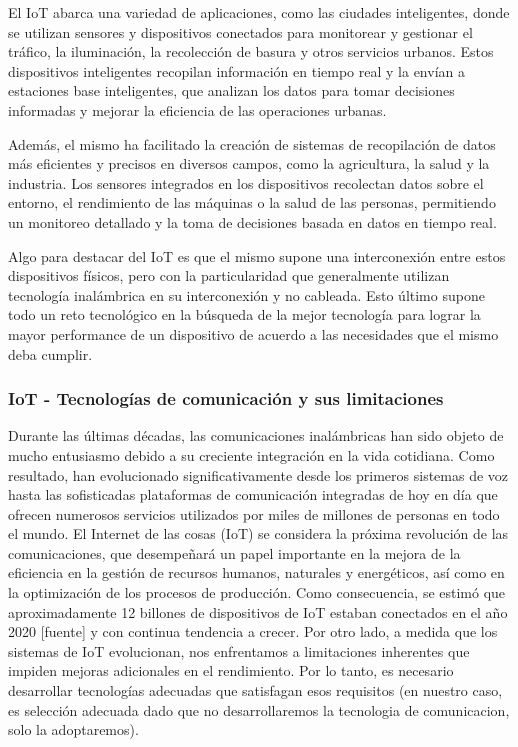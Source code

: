 El IoT abarca una variedad de aplicaciones, como las ciudades inteligentes, donde se utilizan sensores y dispositivos conectados para monitorear y gestionar el tráfico, la iluminación, la recolección de basura y otros servicios urbanos. Estos dispositivos inteligentes recopilan información en tiempo real y la envían a estaciones base inteligentes, que analizan los datos para tomar decisiones informadas y mejorar la eficiencia de las operaciones urbanas.

Además, el mismo ha facilitado la creación de sistemas de recopilación de datos más eficientes y precisos en diversos campos, como la agricultura, la salud y la industria. Los sensores integrados en los dispositivos recolectan datos sobre el entorno, el rendimiento de las máquinas o la salud de las personas, permitiendo un monitoreo detallado y la toma de decisiones basada en datos en tiempo real.

Algo para destacar del IoT es que el mismo supone una interconexión entre estos dispositivos físicos, pero con la particularidad que generalmente utilizan tecnología inalámbrica en su interconexión y no cableada. Esto último supone todo un reto tecnológico en la búsqueda de la mejor tecnología para lograr la mayor performance de un dispositivo de acuerdo a las necesidades que el mismo deba cumplir.


\subsubsection{IoT - Tecnologías de comunicación y sus limitaciones}
Durante las últimas décadas, las comunicaciones inalámbricas han sido objeto de mucho entusiasmo debido a su creciente integración en la vida cotidiana. Como resultado, han evolucionado significativamente desde los primeros sistemas de voz hasta las sofisticadas plataformas de comunicación integradas de hoy en día que ofrecen numerosos servicios utilizados por miles de millones de personas en todo el mundo. El Internet de las cosas (IoT) se considera la próxima revolución de las comunicaciones, que desempeñará un papel importante en la mejora de la eficiencia en la gestión de recursos humanos, naturales y energéticos, así como en la optimización de los procesos de producción. Como consecuencia, se estimó que aproximadamente 12 billones de dispositivos de IoT estaban conectados en el año 2020 [fuente] y con continua tendencia a crecer. Por otro lado, a medida que los sistemas de IoT evolucionan, nos enfrentamos a limitaciones inherentes que impiden mejoras adicionales en el rendimiento. Por lo tanto, es necesario desarrollar tecnologías adecuadas que satisfagan esos requisitos (en nuestro caso, es selección adecuada dado que no desarrollaremos la tecnologia de comunicacion, solo la adoptaremos).

